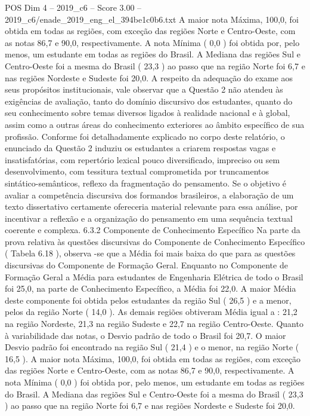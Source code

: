 \begin{textsample}{POS Dim 4 – 2019\_c6 – Score 3.00 – 2019\_c6/enade\_2019\_eng\_el\_394be1c0b6.txt}
A maior nota Máxima, 100,0, foi obtida em todas as regiões, com exceção das regiões Norte e Centro-Oeste, com as notas 86,7 e 90,0, respectivamente.
A nota Mínima ( 0,0 ) foi obtida por, pelo menos, um estudante em todas as regiões do Brasil.
A Mediana das regiões Sul e Centro-Oeste foi a mesma do Brasil ( 23,3 ) ao passo que na região Norte foi 6,7 e nas regiões Nordeste e Sudeste foi 20,0.
A respeito da adequação do exame aos seus propósitos institucionais, vale observar que a Questão 2 não atendeu às exigências de avaliação, tanto do domínio discursivo dos estudantes, quanto do seu conhecimento sobre temas diversos ligados à realidade nacional e à global, assim como a outras áreas do conhecimento exteriores ao âmbito específico de sua profissão.
Conforme foi detalhadamente explicado no corpo deste relatório, o enunciado da Questão 2 induziu os estudantes a criarem respostas vagas e insatisfatórias, com repertório lexical pouco diversificado, impreciso ou sem desenvolvimento, com tessitura textual comprometida por truncamentos sintático-semânticos, reflexo da fragmentação do pensamento.
Se o objetivo é avaliar a competência discursiva dos formandos brasileiros, a elaboração de um texto dissertativo certamente ofereceria material relevante para essa análise, por incentivar a reflexão e a organização do pensamento em uma sequência textual coerente e complexa. 6.3.2 Componente de Conhecimento Específico Na parte da prova relativa às questões discursivas do Componente de Conhecimento Específico ( Tabela 6.18 ), observa -se que a Média foi mais baixa do que para as questões discursivas do Componente de Formação Geral.
Enquanto no Componente de Formação Geral a Média para estudantes de Engenharia Elétrica de todo o Brasil foi 25,0, na parte de Conhecimento Específico, a Média foi 22,0.
A maior Média deste componente foi obtida pelos estudantes da região Sul ( 26,5 ) e a menor, pelos da região Norte ( 14,0 ).
As demais regiões obtiveram Média igual a : 21,2 na região Nordeste, 21,3 na região Sudeste e 22,7 na região Centro-Oeste.
Quanto à variabilidade das notas, o Desvio padrão de todo o Brasil foi 20,7.
O maior Desvio padrão foi encontrado na região Sul ( 21,4 ) e o menor, na região Norte ( 16,5 ).
A maior nota Máxima, 100,0, foi obtida em todas as regiões, com exceção das regiões Norte e Centro-Oeste, com as notas 86,7 e 90,0, respectivamente.
A nota Mínima ( 0,0 ) foi obtida por, pelo menos, um estudante em todas as regiões do Brasil.
A Mediana das regiões Sul e Centro-Oeste foi a mesma do Brasil ( 23,3 ) ao passo que na região Norte foi 6,7 e nas regiões Nordeste e Sudeste foi 20,0.

\end{textsample}
